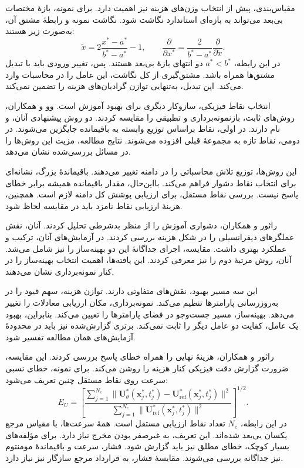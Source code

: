 مقیاس‌بندی، پیش از انتخاب وزن‌های هزینه نیز اهمیت دارد.
برای نمونه، بازهٔ مختصات بی‌بعد می‌تواند به بازه‌ای استاندارد نگاشت شود.
نگاشت نمونه و رابطهٔ مشتق آن، به‌صورت زیر هستند:
\begin{equation}
\widetilde{x}
=2\frac{x^*-a^*}{b^*-a^*}-1,
\qquad
\frac{\partial}{\partial x^*}
=\frac{2}{b^*-a^*}\frac{\partial}{\partial\widetilde{x}}.
\label{eq:lit-pinn-input-scaling}
\end{equation}
در این رابطه، $a^*<b^*$ دو انتهای بازهٔ بی‌بعد هستند.
پس، تغییر ورودی باید با تبدیل مشتق‌ها همراه باشد.
مشتق‌گیری از کل نگاشت، این عامل را در محاسبات وارد می‌کند.
این تبدیل، به‌تنهایی توازن گرادیان‌های هزینه را تضمین نمی‌کند.

انتخاب نقاط فیزیکی، سازوکار دیگری برای بهبود آموزش است.
وو و همکاران، روش‌های ثابت، بازنمونه‌برداری و تطبیقی را مقایسه کردند.
دو روش پیشنهادی آنان،  و  نام دارند.
در اولی، نقاط براساس توزیع وابسته به باقیمانده جایگزین می‌شوند.
در دومی، نقاط تازه به مجموعهٔ قبلی افزوده می‌شوند.
نتایج مطالعه، مزیت این روش‌ها را در مسائل بررسی‌شده نشان می‌دهد.
\cite{Wu2023Sampling}

این روش‌ها، توزیع تلاش محاسباتی را در دامنه تغییر می‌دهند.
باقیماندهٔ بزرگ، نشانه‌ای برای انتخاب نقاط دشوار فراهم می‌کند.
بااین‌حال، مقدار باقیمانده همیشه برابر خطای پاسخ نیست.
بررسی نقاط مستقل، برای ارزیابی پوشش کل دامنه لازم است.
همچنین، هزینهٔ ارزیابی نقاط نامزد باید در مقایسه لحاظ شود.

راثور و همکاران، دشواری آموزش را از منظر بدشرطی تحلیل کردند.
آنان، نقش عملگرهای دیفرانسیلی را در شکل هزینه بررسی کردند.
در آزمایش‌های آنان، ترکیب  و  عملکرد بهتری داشت.
مقایسه، اجرای جداگانهٔ این دو بهینه‌ساز را نیز شامل می‌شد.
آنان، روش مرتبهٔ دوم  را نیز معرفی کردند.
این یافته‌ها، اهمیت انتخاب بهینه‌ساز را در کنار نمونه‌برداری نشان می‌دهند.
\cite{Rathore2024}

این سه مسیر بهبود، نقش‌های متفاوتی دارند.
توازن هزینه، سهم قیود را در به‌روزرسانی پارامترها تنظیم می‌کند.
نمونه‌برداری، مکان ارزیابی معادلات را تغییر می‌دهد.
بهینه‌ساز، مسیر جست‌وجو در فضای پارامترها را تعیین می‌کند.
بنابراین، بهبود یک عامل، کفایت دو عامل دیگر را ثابت نمی‌کند.
برتری گزارش‌شده نیز باید در محدودهٔ آزمایش‌های همان مطالعه تفسیر شود.

راثور و همکاران، هزینهٔ نهایی را همراه خطای پاسخ بررسی کردند.
این مقایسه، ضرورت گزارش دقت فیزیکی کنار هزینه را روشن می‌کند.
\cite{Rathore2024}
برای نمونه، خطای نسبی سرعت روی نقاط مستقل چنین تعریف می‌شود:
\begin{equation}
E_U=
\left[
\frac{\displaystyle\sum_{j=1}^{N_e}
\|\mathbf U_\theta^*(\mathbf x_j^*,t_j^*)
 -\mathbf U_{\mathrm{ref}}^*(\mathbf x_j^*,t_j^*)\|^2}
{\displaystyle\sum_{j=1}^{N_e}
\|\mathbf U_{\mathrm{ref}}^*(\mathbf x_j^*,t_j^*)\|^2}
\right]^{1/2}.
\label{eq:lit-pinn-independent-error}
\end{equation}
در این رابطه، $N_e$ تعداد نقاط ارزیابی مستقل است.
همهٔ سرعت‌ها، با مقیاس مرجع یکسان بی‌بعد شده‌اند.
این تعریف، به غیرصفر بودن مخرج نیاز دارد.
برای مؤلفه‌های بسیار کوچک، خطای مطلق نیز باید گزارش شود.
فشار، سرعت و باقیماندهٔ مومنتوم نیز جداگانه بررسی می‌شوند.
مقایسهٔ فشار، به قرارداد مرجع سازگار نیز نیاز دارد.

